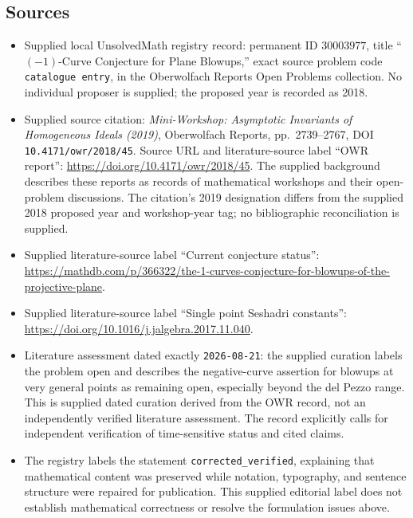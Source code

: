 \documentclass[11pt]{article}
\begin{document}
\subsection{Sources}
\begin{itemize}
\item Supplied local UnsolvedMath registry record: permanent ID \(30003977\), title ``\((-1)\)-Curve Conjecture for Plane Blowups,'' exact source problem code \texttt{catalogue entry}, in the Oberwolfach Reports Open Problems collection. No individual proposer is supplied; the proposed year is recorded as 2018.
\item Supplied source citation: \emph{Mini-Workshop: Asymptotic Invariants of Homogeneous Ideals (2019)}, Oberwolfach Reports, pp.\ 2739--2767, DOI \texttt{10.4171/owr/2018/45}. Source URL and literature-source label ``OWR report'': \url{https://doi.org/10.4171/owr/2018/45}. The supplied background describes these reports as records of mathematical workshops and their open-problem discussions. The citation's 2019 designation differs from the supplied 2018 proposed year and workshop-year tag; no bibliographic reconciliation is supplied.
\item Supplied literature-source label ``Current conjecture status'': \url{https://mathdb.com/p/366322/the-1-curves-conjecture-for-blowups-of-the-projective-plane}.
\item Supplied literature-source label ``Single point Seshadri constants'': \url{https://doi.org/10.1016/j.jalgebra.2017.11.040}.
\item Literature assessment dated exactly \texttt{2026-08-21}: the supplied curation labels the problem open and describes the negative-curve assertion for blowups at very general points as remaining open, especially beyond the del Pezzo range. This is supplied dated curation derived from the OWR record, not an independently verified literature assessment. The record explicitly calls for independent verification of time-sensitive status and cited claims.
\item The registry labels the statement \texttt{corrected\_verified}, explaining that mathematical content was preserved while notation, typography, and sentence structure were repaired for publication. This supplied editorial label does not establish mathematical correctness or resolve the formulation issues above.
\end{itemize}
\end{document}
